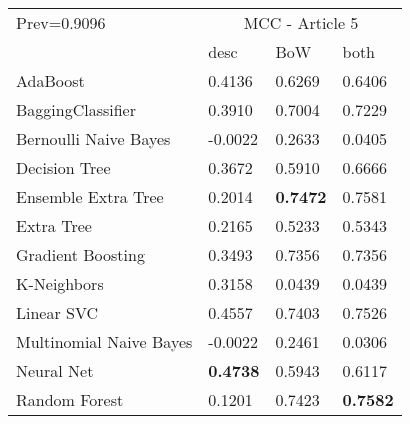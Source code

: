\begin{tabular}{|l|l|l|l| }
\hline
Prev=0.9096 &  \multicolumn{3}{c|}{MCC - Article 5} \\
\cline{2-4} & desc & BoW & both \\ \hline
AdaBoost                & 0.4136 & 0.6269 & 0.6406\\
BaggingClassifier       & 0.3910 & 0.7004 & 0.7229\\
Bernoulli Naive Bayes   & -0.0022 & 0.2633 & 0.0405\\
Decision Tree           & 0.3672 & 0.5910 & 0.6666\\
Ensemble Extra Tree     & 0.2014 & {\bf 0.7472} & 0.7581\\
Extra Tree              & 0.2165 & 0.5233 & 0.5343\\
Gradient Boosting       & 0.3493 & 0.7356 & 0.7356\\
K-Neighbors             & 0.3158 & 0.0439 & 0.0439\\
Linear SVC              & 0.4557 & 0.7403 & 0.7526\\
Multinomial Naive Bayes & -0.0022 & 0.2461 & 0.0306\\
Neural Net              & {\bf 0.4738} & 0.5943 & 0.6117\\
Random Forest           & 0.1201 & 0.7423 & {\bf 0.7582}\\
\hline
\end{tabular}